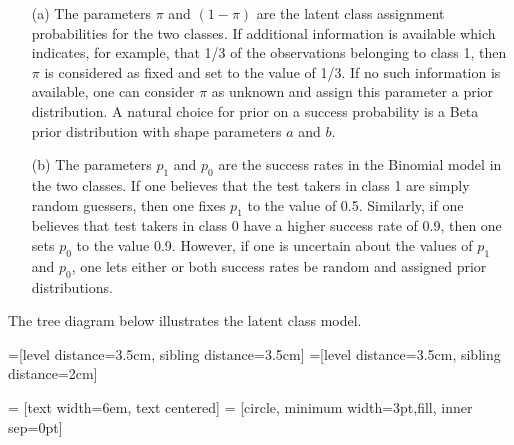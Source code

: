 \documentclass[11pt]{article}
\begin{document}
\begin{itemize}
\item[(a)] The parameters $\pi$ and $(1 - \pi)$ are the latent class assignment probabilities for the two classes.  If additional information is available which indicates, for example,  that 1/3 of the observations belonging to class 1, then $\pi$ is considered as  fixed and set to the value of 1/3. 
If no such information is available, one can consider $\pi$ as unknown and assign this parameter a prior distribution. A natural choice for prior on a success probability is a Beta prior distribution
with shape parameters $a$ and $b$.

\item[(b)] The parameters $p_1$ and $p_0$ are the success rates in the Binomial model in the two classes. If one believes that  the test takers in class 1 are simply random guessers, then one fixes $p_1$ to the value of 0.5. Similarly, if one believes that test takers in class 0 have a higher success rate of 0.9, then one sets $p_0$ to the value 0.9. However, if one is uncertain about the values of $p_1$ and $p_0$, one  lets either or both success rates be random and assigned prior distributions.

\end{itemize}


\newpage

The tree diagram below illustrates the latent class model.

=[level distance=3.5cm, sibling distance=3.5cm]
=[level distance=3.5cm, sibling distance=2cm]


 = [text width=6em, text centered]
 = [circle, minimum width=3pt,fill, inner sep=0pt]
\end{document}

